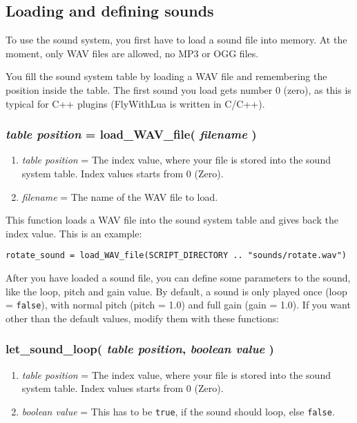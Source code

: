 \documentclass[11pt,parskip=half,a4paper]{scrartcl}
\begin{document}
\subsection{Loading and defining sounds}

To use the sound system, you first have to load a sound file into memory. At the moment, only WAV files are allowed, no MP3 or OGG files.

You fill the sound system table by loading a WAV file and remembering the position inside the table. The first sound you load gets number 0 (zero), as this is typical for C++ plugins (FlyWithLua is written in C/C++).

\subsubsection{\emph{table position} = load\_WAV\_file( \emph{filename} )}

\begin{enumerate}
	\item \emph{table position} = The index value, where your file is stored into the sound system table. Index values starts from 0 (Zero).
	\item \emph{filename} = The name of the WAV file to load.
\end{enumerate}

This function loads a WAV file into the sound system table and gives back the index value. This is an example:


\begin{lstlisting}
rotate_sound = load_WAV_file(SCRIPT_DIRECTORY .. "sounds/rotate.wav")
\end{lstlisting}

After you have loaded a sound file, you can define some parameters to the sound, like the loop, pitch and gain value. By default, a sound is only played once (loop = \verb|false|), with normal pitch (pitch = 1.0) and full gain (gain = 1.0). If you want other than the default values, modify them with these functions:

\subsubsection{ let\_sound\_loop( \emph{table position}, \emph{boolean value} )}

\begin{enumerate}
	\item \emph{table position} = The index value, where your file is stored into the sound system table. Index values starts from 0 (Zero).
	\item \emph{boolean value} = This has to be \verb|true|, if the sound should loop, else \verb|false|.
\end{enumerate}
\end{document}
